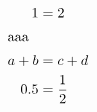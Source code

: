 \documentclass{article}
\begin{document}
\begin{align}
1 &=2\\
\intertext{aaa}
a+b&=c+d\\
0.5&=\frac{1}{2}
\end{align}
\end{document}
